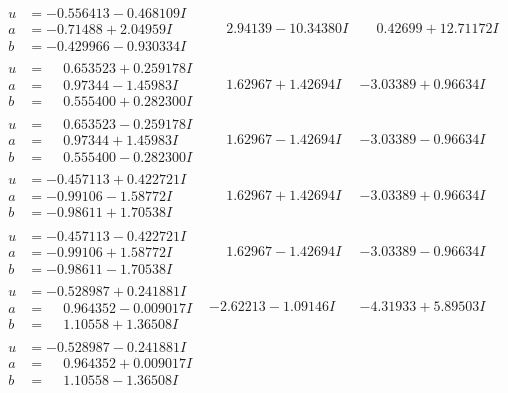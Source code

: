 \documentclass[1p]{elsarticle_modified}
\theoremstyle{definition}
\begin{document}
$$\begin{array}{c|c|c}
\begin{aligned}
u &= -0.556413 - 0.468109 I \\
a &= -0.71488 + 2.04959 I \\
b &= -0.429966 - 0.930334 I\end{aligned}
 & \phantom{-}2.94139 - 10.34380 I & \phantom{-}0.42699 + 12.71172 I \\ \hline\begin{aligned}
u &= \phantom{-}0.653523 + 0.259178 I \\
a &= \phantom{-}0.97344 - 1.45983 I \\
b &= \phantom{-}0.555400 + 0.282300 I\end{aligned}
 & \phantom{-}1.62967 + 1.42694 I & -3.03389 + 0.96634 I \\ \hline\begin{aligned}
u &= \phantom{-}0.653523 - 0.259178 I \\
a &= \phantom{-}0.97344 + 1.45983 I \\
b &= \phantom{-}0.555400 - 0.282300 I\end{aligned}
 & \phantom{-}1.62967 - 1.42694 I & -3.03389 - 0.96634 I \\ \hline\begin{aligned}
u &= -0.457113 + 0.422721 I \\
a &= -0.99106 - 1.58772 I \\
b &= -0.98611 + 1.70538 I\end{aligned}
 & \phantom{-}1.62967 + 1.42694 I & -3.03389 + 0.96634 I \\ \hline\begin{aligned}
u &= -0.457113 - 0.422721 I \\
a &= -0.99106 + 1.58772 I \\
b &= -0.98611 - 1.70538 I\end{aligned}
 & \phantom{-}1.62967 - 1.42694 I & -3.03389 - 0.96634 I \\ \hline\begin{aligned}
u &= -0.528987 + 0.241881 I \\
a &= \phantom{-}0.964352 - 0.009017 I \\
b &= \phantom{-}1.10558 + 1.36508 I\end{aligned}
 & -2.62213 - 1.09146 I & -4.31933 + 5.89503 I \\ \hline\begin{aligned}
u &= -0.528987 - 0.241881 I \\
a &= \phantom{-}0.964352 + 0.009017 I \\
b &= \phantom{-}1.10558 - 1.36508 I\end{aligned}

\end{array}$$
\end{document}
